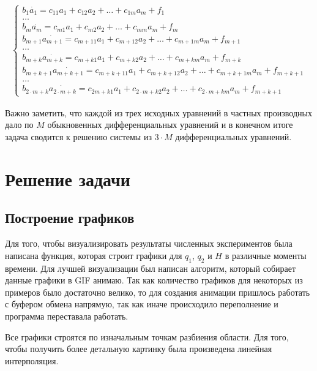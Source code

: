 \documentclass[14pt]{extreport}
\begin{document}
\begin{eqnarray}
\begin{cases}
b_1 \dot{a_{1}} = c_{11} a_1 + c_{12} a_2 + \dots + c_{1m} a_m + f_1 \\
\dots \\
b_m \dot{a_{m}} = c_{m1} a_1 + c_{m2} a_2 + \dots + c_{mm} a_m + f_m\\
b_{m+1} \dot{a_{m+1}} = c_{{m+1}1} a_1 + c_{{m+1}2} a_2 + \dots + c_{{m+1}m} a_m + f_{m+1} \\
\dots \\
b_{m+k} \dot{a_{m+k}} = c_{{m+k}1} a_1 + c_{{m+k}2} a_2 + \dots + c_{{m+k}m} a_m + f_{m+k} \\
b_{m+k+1} \dot{a_{m+k+1}} = c_{{m+k+1}1} a_1 + c_{{m+k+1}2} a_2 + \dots + c_{{m+k+1}m} a_m + f_{m+k+1} \\
\dots \\
b_{2\cdot m + k} \dot{a_{2\cdot m + k}} = c_{{2m + k}1} a_1 + c_{{2\cdot m + k}2} a_2 + \dots + c_{{2\cdot m + k}m} a_m + f_{m+k+1}
\end{cases}
\end{eqnarray}

Важно заметить, что каждой из трех исходных уравнений в частных производных дало по $M$ обыкновенных дифференциальных уравнений и в конечном итоге задача сводится к решению системы из $3\cdot M$ дифференциальных уравнений.


\chapter{Решение задачи}

\section{Построение графиков}

Для того, чтобы визуализировать результаты численных экспериментов была написана функция, которая строит графики для $q_1$, $q_2$ и $H$ в различные моменты времени. Для лучшей визуализации был написан алгоритм, который собирает данные графики в GIF анимаю. Так как количество графиков для некоторых из примеров было достаточно велико, то для создания анимации пришлось работать с буфером обмена напрямую, так как иначе происходило переполнение и программа переставала работать.

Все графики строятся по изначальным точкам разбиения области. Для того, чтобы получить более детальную картинку была произведена линейная интерполяция.
\end{document}
